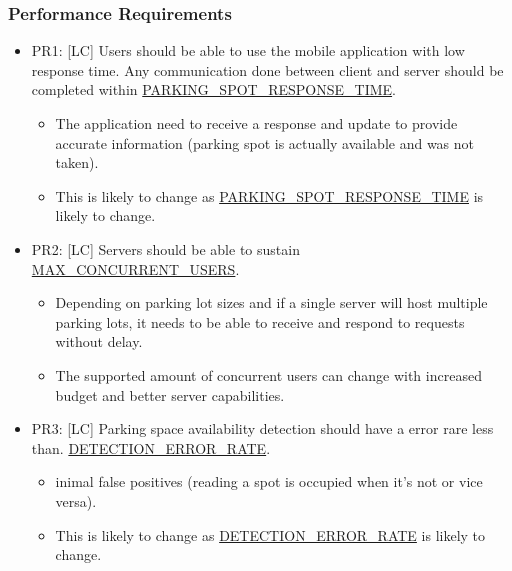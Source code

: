 \documentclass[]{article}
\begin{document}
\subsubsection{Performance Requirements}
\begin{itemize}
	\item PR1: [LC] Users should be able to use the mobile application with low response time. Any communication done between client and server should be completed within \hyperlink{RESPONSETIME}{PARKING\_SPOT\_RESPONSE\_TIME}.
	\begin{itemize}
		\item The application need to receive a response and update to provide accurate information (parking spot is actually available and was not taken).
		\item This is likely to change as \hyperlink{RESPONSETIME}{PARKING\_SPOT\_RESPONSE\_TIME} is likely to change.
	\end{itemize}

	\item PR2: [LC] Servers should be able to sustain \hyperlink{CONCUSERS}{MAX\_CONCURRENT\_USERS}.
	\begin{itemize}
		\item Depending on parking lot sizes and if a single server will host multiple parking lots, it needs to be able to receive and respond to requests without delay.
		\item The supported amount of concurrent users can change with increased budget and better server capabilities.
	\end{itemize}

	\item PR3: [LC] Parking space availability detection should have a error rare less than. \hyperlink{DETERR}{DETECTION\_ERROR\_RATE}.
	\begin{itemize}
		\item inimal false positives (reading a spot is occupied when it’s not or vice versa).
		\item This is likely to change as \hyperlink{DETERR}{DETECTION\_ERROR\_RATE} is likely to change.
	\end{itemize}
\end{itemize}
\end{document}
